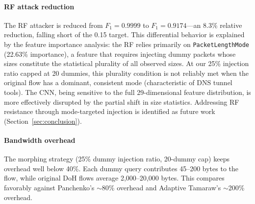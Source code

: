 \documentclass[conference]{IEEEtran}
\begin{document}
\paragraph{RF attack reduction} The RF attacker is reduced from $F_1=0.9999$ to $F_1=0.9174$---an 8.3\% relative reduction, falling short of the 0.15 target. This differential behavior is explained by the feature importance analysis: the RF relies primarily on \texttt{PacketLengthMode} (22.63\% importance), a feature that requires injecting dummy packets whose sizes constitute the statistical plurality of all observed sizes. At our 25\% injection ratio capped at 20 dummies, this plurality condition is not reliably met when the original flow has a dominant, consistent mode (characteristic of DNS tunnel tools). The CNN, being sensitive to the full 29-dimensional feature distribution, is more effectively disrupted by the partial shift in size statistics. Addressing RF resistance through mode-targeted injection is identified as future work (Section~\ref{sec:conclusion}).

\paragraph{Bandwidth overhead} The morphing strategy (25\% dummy injection ratio, 20-dummy cap) keeps overhead well below 40\%. Each dummy query contributes 45--200 bytes to the flow, while original DoH flows average 2,000--20,000 bytes. This compares favorably against Panchenko's $\sim$80\% overhead and Adaptive Tamaraw's $\sim$200\% overhead.

\begin{table}[h]
\centering
\caption{Attack Model Performance: Undefended vs. DoH-Shield Defended}
\label{tab:attack_perf}
\end{table}
\end{document}
